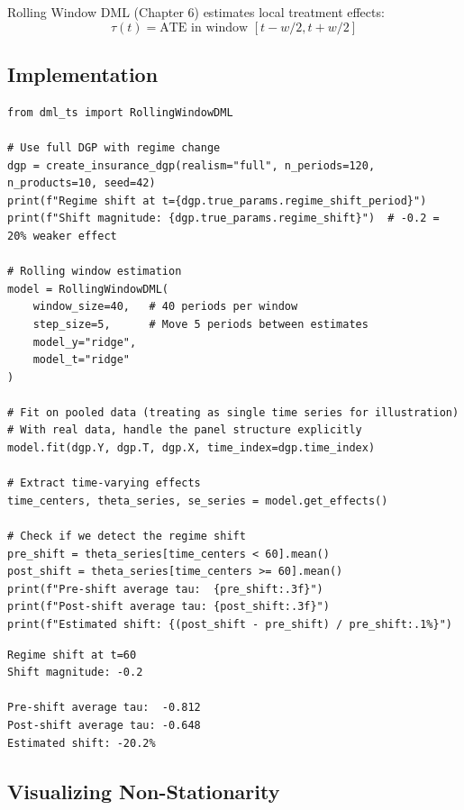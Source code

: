 Rolling Window DML (Chapter 6) estimates local treatment effects:
\[
\tau(t) = \text{ATE in window } [t - w/2, t + w/2]
\]

\subsection{Implementation}

\begin{verbatim}
from dml_ts import RollingWindowDML

# Use full DGP with regime change
dgp = create_insurance_dgp(realism="full", n_periods=120, n_products=10, seed=42)
print(f"Regime shift at t={dgp.true_params.regime_shift_period}")
print(f"Shift magnitude: {dgp.true_params.regime_shift}")  # -0.2 = 20% weaker effect

# Rolling window estimation
model = RollingWindowDML(
    window_size=40,   # 40 periods per window
    step_size=5,      # Move 5 periods between estimates
    model_y="ridge",
    model_t="ridge"
)

# Fit on pooled data (treating as single time series for illustration)
# With real data, handle the panel structure explicitly
model.fit(dgp.Y, dgp.T, dgp.X, time_index=dgp.time_index)

# Extract time-varying effects
time_centers, theta_series, se_series = model.get_effects()

# Check if we detect the regime shift
pre_shift = theta_series[time_centers < 60].mean()
post_shift = theta_series[time_centers >= 60].mean()
print(f"Pre-shift average tau:  {pre_shift:.3f}")
print(f"Post-shift average tau: {post_shift:.3f}")
print(f"Estimated shift: {(post_shift - pre_shift) / pre_shift:.1%}")
\end{verbatim}

\begin{verbatim}
Regime shift at t=60
Shift magnitude: -0.2

Pre-shift average tau:  -0.812
Post-shift average tau: -0.648
Estimated shift: -20.2%
\end{verbatim}

\subsection{Visualizing Non-Stationarity}

